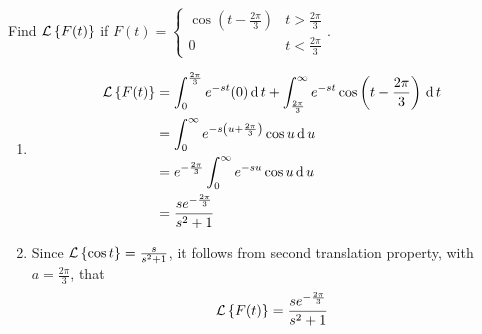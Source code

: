 \documentclass[../main-sheet.tex]{subfiles}
\begin{document}
\begin{prob}
    Find $ \mathcal{L}\left\{ F(t)\right\}  $ if $ F(t)=\begin{cases}
        \cos\left( t-\frac{2\pi}{3} \right) & t>\frac{2\pi}{3}\\
        0 & t<\frac{2\pi}{3}
    \end{cases} $.
\end{prob}
\newpage
\begin{soln}\hfill
    \begin{enumerate}[label={Method \arabic*.}]
        \item \begin{align*}
            \mathcal{L}\left\{ F(t)\right\}&=\int_0^{\frac{2\pi}{3}} e^{-st}(0)\,\mathrm{d}\, t+\int_{\frac{2\pi}{3}}^\infty e^{-st} \cos \left( t-\frac{2\pi}{3} \right)\,\mathrm{d}\, t\\
            &=\int_0^\infty e^{-s\left( u+\frac{2\pi}{3} \right)} \cos u \,\mathrm{d}\, u\\
            &=e^{-\frac{2\pi}{3}}\int_0^\infty e^{-su} \cos u \,\mathrm{d}\, u\\
            &=\frac{se^{-\frac{2\pi}{3}}}{s^2+1}
        \end{align*}
        \item Since $ \mathcal{L}\left\{ \cos t\right\}=\frac{s}{s^2+1} $, it follows from second translation property, with $ a=\frac{2\pi}{3} $, that 
        \[
            \mathcal{L}\left\{ F(t)\right\}=\frac{se^{-\frac{2\pi}{3}}}{s^2+1}
        \]
    \end{enumerate}
\end{soln}
\end{document}
